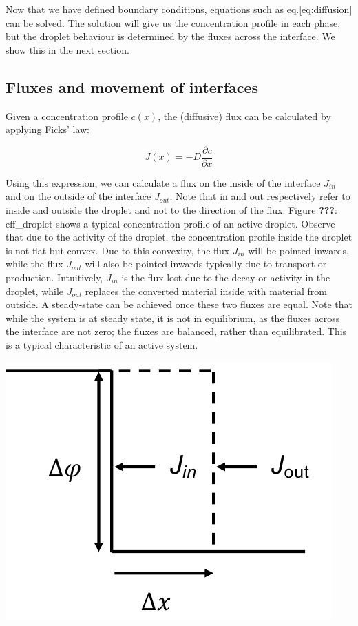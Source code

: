 \documentclass[12pt,a4paper,]{Dissertate}
\let\origfigure\figure
\let\endorigfigure\endfigure
\renewenvironment{figure}[1][2] {
    \expandafter\origfigure\expandafter[H]
} {
    \endorigfigure
}
\begin{document}
Now that we have defined boundary conditions, equations such as
eq.\ref{eq:diffusion} can be solved. The solution will give us the
concentration profile in each phase, but the droplet behaviour is
determined by the fluxes across the interface. We show this in the next
section.

\hypertarget{fluxes-and-movement-of-interfaces}{%
\subsection{Fluxes and movement of
interfaces}\label{fluxes-and-movement-of-interfaces}}

Given a concentration profile \(c(x)\), the (diffusive) flux can be
calculated by applying Ficks' law:

\[
J(x) = -D\frac{\partial c}{\partial x}
\]

Using this expression, we can calculate a flux on the inside of the
interface \(J_{in}\) and on the outside of the interface \(J_{out}\).
Note that in and out respectively refer to inside and outside the
droplet and not to the direction of the flux. Figure \textbf{???}:
eff\_droplet shows a typical concentration profile of an active droplet.
Observe that due to the activity of the droplet, the concentration
profile inside the droplet is not flat but convex. Due to this
convexity, the flux \(J_{in}\) will be pointed inwards, while the flux
\(J_{out}\) will also be pointed inwards typically due to transport or
production. Intuitively, \(J_{in}\) is the flux lost due to the decay or
activity in the droplet, while \(J_{out}\) replaces the converted
material inside with material from outside. A steady-state can be
achieved once these two fluxes are equal. Note that while the system is
at steady state, it is not in equilibrium, as the fluxes across the
interface are not zero; the fluxes are balanced, rather than
equilibrated. This is a typical characteristic of an active system.

\begin{figure}
\hypertarget{fig:interfacespeed}{%
\centering
\includegraphics{source/figures/pdf/interface.pdf}
\caption{Figure illuminating the relation between a moving interface and
the fluxes across it.}\label{fig:interfacespeed}
}
\end{figure}
\end{document}

